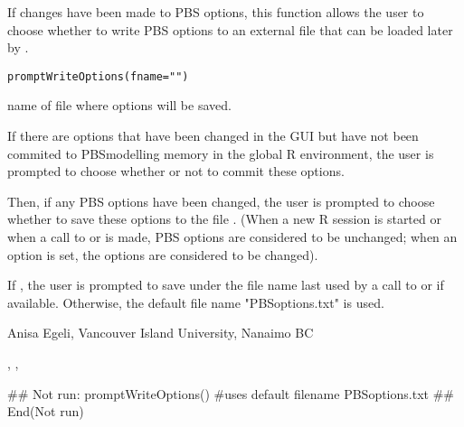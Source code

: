 \documentclass[letterpaper]{book}
\begin{document}
\begin{Description}\relax
If changes have been made to PBS options, this function allows 
the user to choose whether to write PBS options to an external 
file that can be loaded later by .
\end{Description}
\begin{Usage}
\begin{verbatim}
promptWriteOptions(fname="")
\end{verbatim}
\end{Usage}
\begin{Arguments}
\begin{ldescription}
\item[\code{fname}] name of file where options will be saved.
\end{ldescription}
\end{Arguments}
\begin{Details}\relax
If there are options that have been changed in the GUI but have not been
commited to PBSmodelling memory in the global R environment, the user
is prompted to choose whether or not to commit these options.

Then, if any PBS options have been changed, the user is prompted to choose
whether to save these options to the file . (When a new R session is
started or when a call to  or  is made,
PBS options are considered to be unchanged; when an option is set,
the options are considered to be changed).

If , the user is prompted to save under the file name last used 
by a call to  or  if available. 
Otherwise, the default file name "PBSoptions.txt" is used.
\end{Details}
\begin{Author}\relax
Anisa Egeli, Vancouver Island University, Nanaimo BC
\end{Author}
\begin{SeeAlso}\relax
{}, ,
\end{SeeAlso}
\begin{Examples}
\begin{ExampleCode}
## Not run: 
promptWriteOptions() #uses default filename PBSoptions.txt
## End(Not run)
\end{ExampleCode}
\end{Examples}
\end{document}
